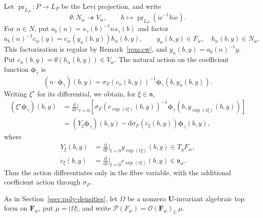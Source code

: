 \documentclass[a4paper,12pt]{amsart}
\numberwithin{equation}{section}
\theoremstyle{definition}
\theoremstyle{remark}
\newcommand{\U}{\mathbf U}
\newcommand{\F}{\mathbf F}
\newcommand{\C}{\mathbb C}
\newcommand{\fn}{\mathfrak n}
\newcommand{\mcP}{\mathcal P}
\begin{document}
Let $\operatorname{pr}_{L_P}:P\to L_P$ be the Levi projection, and write
\[
 \theta:N_w\twoheadrightarrow V_w,\qquad
 h\longmapsto\operatorname{pr}_{L_P}(\dot w^{-1}h\dot w).
\]
For $n\in N$, put $a_b(n)=s_\gamma(b)^{-1}ns_\gamma(b)$ and factor
\[
 a_b(n)^{-1}c_w(y)=c_w(y_n(b,y))h_n(b,y),
 \qquad y_n(b,y)\in F_w,\quad h_n(b,y)\in N_w.
\]
This factorization is regular by Remark~\ref{rem:cw}, and $y_n(b,y)=a_b(n)^{-1}y$. Put $c_n(b,y)=\theta(h_n(b,y))\in V_w$. The natural action on the coefficient function $\boldsymbol\phi_\gamma$ is
\begin{equation}\label{eq:PQ-orbit-action}
 (n\cdot\boldsymbol\phi_\gamma)(b,y)
 =\sigma_F(c_n(b,y))^{-1}\boldsymbol\phi_\gamma(b,y_n(b,y)).
\end{equation}
Writing $\xi^\star$ for its differential, we obtain, for $\xi\in\fn$,
\[
 \begin{aligned}
 (\xi^\star\boldsymbol\phi_\gamma)(b,y)
 &=\frac{\mathrm d}{\mathrm dt}\Big|_{t=0}
   \left[\sigma_F(c_{\exp(t\xi)}(b,y))^{-1}
   \boldsymbol\phi_\gamma(b,y_{\exp(t\xi)}(b,y))\right]\\
 &=(Y_\xi\boldsymbol\phi_\gamma)(b,y)
  -\mathrm d\sigma_F(\dot c_\xi(b,y))\boldsymbol\phi_\gamma(b,y),
 \end{aligned}
\]
where
\[
 \begin{aligned}
 Y_\xi(b,y)&=\frac{\mathrm d}{\mathrm dt}\Big|_{t=0}
   y_{\exp(t\xi)}(b,y)\in T_yF_w,\\
 \dot c_\xi(b,y)&=\frac{\mathrm d}{\mathrm dt}\Big|_{t=0}
   c_{\exp(t\xi)}(b,y)\in\mathfrak v_w.
 \end{aligned}
\]
Thus the action differentiates only in the fibre variable, with the additional coefficient action through $\sigma_F$.

As in Section~\ref{ssec:poly-densities}, let $\Omega$ be a nonzero $\U$-invariant algebraic top form on $\F_w$, put $\mu=|\Omega|$, and write $\mcP(F_w)=\mathcal O(\F_w)_\C\,\mu$.
\end{document}
